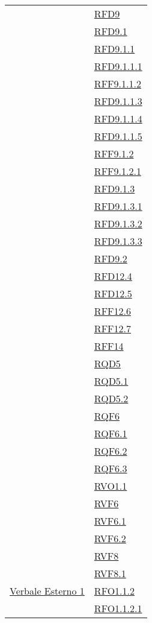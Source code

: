 \begin{longtable}{|>{\centering}m{5cm}|m{5cm}<{\centering}|}
& \hyperlink{RFD9}{RFD9}\\
& \hyperlink{RFD9.1}{RFD9.1}\\
& \hyperlink{RFD9.1.1}{RFD9.1.1}\\
& \hyperlink{RFD9.1.1.1}{RFD9.1.1.1}\\
& \hyperlink{RFF9.1.1.2}{RFF9.1.1.2}\\
& \hyperlink{RFD9.1.1.3}{RFD9.1.1.3}\\
& \hyperlink{RFD9.1.1.4}{RFD9.1.1.4}\\
& \hyperlink{RFD9.1.1.5}{RFD9.1.1.5}\\
& \hyperlink{RFF9.1.2}{RFF9.1.2}\\
& \hyperlink{RFF9.1.2.1}{RFF9.1.2.1}\\
& \hyperlink{RFD9.1.3}{RFD9.1.3}\\
& \hyperlink{RFD9.1.3.1}{RFD9.1.3.1}\\
& \hyperlink{RFD9.1.3.2}{RFD9.1.3.2}\\
& \hyperlink{RFD9.1.3.3}{RFD9.1.3.3}\\
& \hyperlink{RFD9.2}{RFD9.2}\\
& \hyperlink{RFD12.4}{RFD12.4}\\
& \hyperlink{RFD12.5}{RFD12.5}\\
& \hyperlink{RFF12.6}{RFF12.6}\\
& \hyperlink{RFF12.7}{RFF12.7}\\
& \hyperlink{RFF14}{RFF14}\\
& \hyperlink{RQD5}{RQD5}\\
& \hyperlink{RQD5.1}{RQD5.1}\\
& \hyperlink{RQD5.2}{RQD5.2}\\
& \hyperlink{RQF6}{RQF6}\\
& \hyperlink{RQF6.1}{RQF6.1}\\
& \hyperlink{RQF6.2}{RQF6.2}\\
& \hyperlink{RQF6.3}{RQF6.3}\\
& \hyperlink{RVO1.1}{RVO1.1}\\
& \hyperlink{RVF6}{RVF6}\\
& \hyperlink{RVF6.1}{RVF6.1}\\
& \hyperlink{RVF6.2}{RVF6.2}\\
& \hyperlink{RVF8}{RVF8}\\
& \hyperlink{RVF8.1}{RVF8.1}\\ \hline
\hyperlink{Verbale Esterno 1}{Verbale Esterno 1} & \hyperlink{RFO1.1.2}{RFO1.1.2}\\
& \hyperlink{RFO1.1.2.1}{RFO1.1.2.1}\\

\end{longtable}
